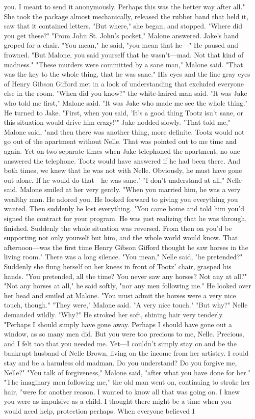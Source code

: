 \documentclass{novel}
\begin{document}
you. I meant to send it anonymously. Perhaps this was the better way after all." She took the package almost mechanically, released the rubber band that held it, saw that it contained letters. "But where," she began, and stopped. "Where did you get these?" "From John St. John’s pocket," Malone answered. Jake’s hand groped for a chair. "You mean," he said, "you mean that he—" He paused and frowned. "But Malone, you said yourself that he wasn’t—mad. Not that kind of madness." "These murders were committed by a sane man," Malone said. "That was the key to the whole thing, that he was sane." His eyes and the fine gray eyes of Henry Gibson Gifford met in a look of understanding that excluded everyone else in the room. "When did you know?" the white-haired man said. "It was Jake who told me first," Malone said. "It was Jake who made me see the whole thing." He turned to Jake. "First, when you said, 'It’s a good thing Tootz isn’t sane, or this situation would drive him crazy!'" Jake nodded slowly. "That told me," Malone said, "and then there was another thing, more definite. Tootz would not go out of the apartment without Nelle. That was pointed out to me time and again. Yet on two separate times when Jake telephoned the apartment, no one answered the telephone. Tootz would have answered if he had been there. And both times, we knew that he was not with Nelle. Obviously, he must have gone out alone. If he would do that—he was sane." "I don’t understand at all," Nelle said. Malone smiled at her very gently. "When you married him, he was a very wealthy man. He adored you. He looked forward to giving you everything you wanted. Then suddenly he lost everything. "You came home and told him you’d signed the contract for your program. He was just realizing that he was through, finished. Suddenly the whole situation was reversed. From then on you’d be supporting not only yourself but him, and the whole world would know. That afternoon—was the first time Henry Gibson Gifford thought he saw horses in the living room." There was a long silence. "You mean," Nelle said, "he pretended?" Suddenly she flung herself on her knees in front of Tootz’ chair, grasped his hands. "You pretended, all the time? You never saw any horses? Not any at all?" "Not any horses at all," he said softly, "nor any men following me." He looked over her head and smiled at Malone. "You must admit the horses were a very nice touch, though." "They were," Malone said. "A very nice touch." "But why?" Nelle demanded wildly. "Why?" He stroked her soft, shining hair very tenderly. "Perhaps I should simply have gone away. Perhaps I should have gone out a window, as so many men did. But you were too precious to me, Nelle. Precious, and I felt too that you needed me. Yet—I couldn’t simply stay on and be the bankrupt husband of Nelle Brown, living on the income from her artistry. I could stay and be a harmless old madman. Do you understand? Do you forgive me, Nelle?" "You talk of forgiveness," Malone said, "after what you have done for her." "The imaginary men following me," the old man went on, continuing to stroke her hair, "were for another reason. I wanted to know all that was going on. I knew you were as impulsive as a child. I thought there might be a time when you would need help, protection perhaps. When everyone believed I 
\end{document}
